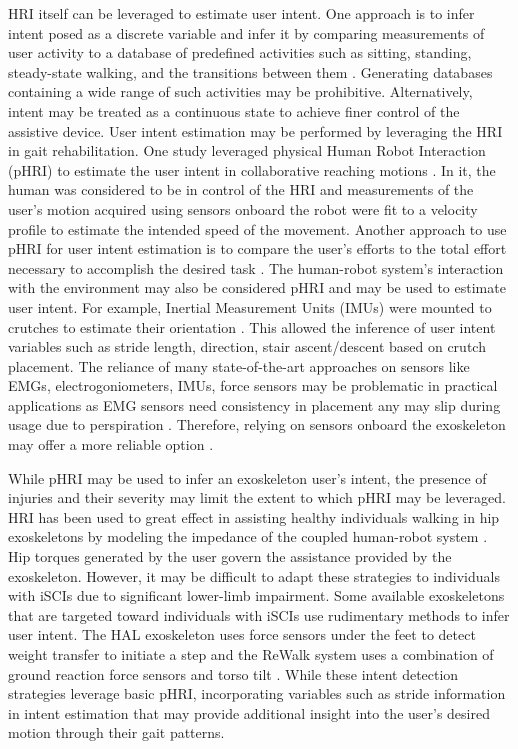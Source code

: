 HRI itself can be leveraged to estimate user intent. One approach is to infer intent posed as a discrete variable and infer it by comparing measurements of user activity to a database of predefined activities such as sitting, standing, steady-state walking, and the transitions between them \cite{shen2013motion}. Generating databases containing a wide range of such activities may be prohibitive. Alternatively, intent may be treated as a continuous state to achieve finer control of the assistive device. User intent estimation may be performed by leveraging the HRI in gait rehabilitation. One study leveraged physical Human Robot Interaction (pHRI) to estimate the user intent in collaborative reaching motions  \cite{corteville2007human}. In it, the human was considered to be in control of the HRI and measurements of the user's motion acquired using sensors onboard the robot were fit to a velocity profile to estimate the intended speed of the movement. Another approach to use pHRI for user intent estimation is to compare the user's efforts to the total effort necessary to accomplish the desired task \cite{pehlivan2015minimal}. The human-robot system's interaction with the environment may also be considered pHRI and may be used to estimate user intent. For example, Inertial Measurement Units (IMUs) were mounted to crutches to estimate their orientation \cite{brescianini2011ins}. This allowed the inference of user intent variables such as stride length, direction, stair ascent/descent based on crutch placement. The reliance of many state-of-the-art approaches on sensors like EMGs, electrogoniometers, IMUs, force sensors may be problematic in practical applications as EMG sensors need consistency in placement any may slip during usage due to perspiration \cite{tkach2010study,ison2014role}. Therefore, relying on sensors onboard the exoskeleton may offer a more reliable option \cite{Gambon20b}. 

While pHRI may be used to infer an exoskeleton user's intent, the presence of injuries and their severity may limit the extent to which pHRI may be leveraged. HRI has been used to great effect in assisting healthy individuals walking in hip exoskeletons by modeling the impedance of the coupled human-robot system \cite{zhang2019admittance,nagarajan2016integral}. Hip torques generated by the user govern the assistance provided by the exoskeleton. However, it may be difficult to adapt these strategies to individuals with iSCIs due to significant lower-limb impairment. Some available exoskeletons that are targeted toward individuals with iSCIs use rudimentary methods to infer user intent. The HAL exoskeleton uses force sensors under the feet to detect weight transfer to initiate a step \cite{suzuki2007intention} and the ReWalk system uses a combination of ground reaction force sensors and torso tilt \cite{goffer2012locomotion}. While these intent detection strategies leverage basic pHRI, incorporating variables such as stride information in intent estimation that may provide additional insight into the user's desired motion through their gait patterns.

